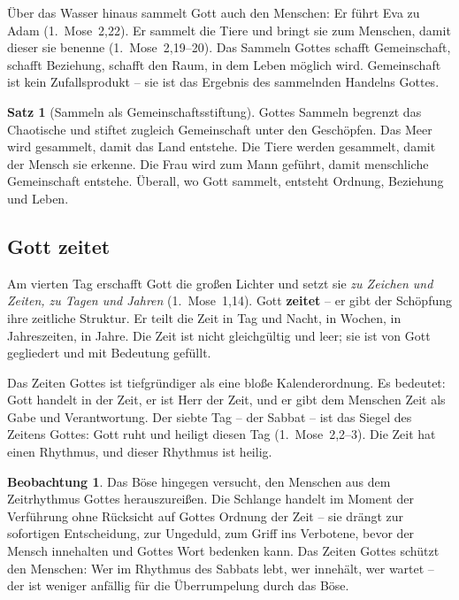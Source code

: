 ﻿\documentclass[a4paper,12pt]{article}
\theoremstyle{definition}
\newtheorem{theorem}{Satz}[section]
\newtheorem{observation}{Beobachtung}[section]
\begin{document}
Über das Wasser hinaus sammelt Gott auch den Menschen: Er führt Eva zu Adam
(1.~Mose~2,22). Er sammelt die Tiere und bringt sie zum Menschen, damit dieser
sie benenne (1.~Mose~2,19--20). Das Sammeln Gottes schafft Gemeinschaft, schafft
Beziehung, schafft den Raum, in dem Leben möglich wird. Gemeinschaft ist kein
Zufallsprodukt -- sie ist das Ergebnis des sammelnden Handelns Gottes.

\begin{theorem}[Sammeln als Gemeinschaftsstiftung]
	Gottes Sammeln begrenzt das Chaotische und stiftet zugleich Gemeinschaft unter
	den Geschöpfen. Das Meer wird gesammelt, damit das Land entstehe. Die Tiere
	werden gesammelt, damit der Mensch sie erkenne. Die Frau wird zum Mann geführt,
	damit menschliche Gemeinschaft entstehe. Überall, wo Gott sammelt, entsteht
	Ordnung, Beziehung und Leben.
\end{theorem}

\subsection{Gott zeitet}

Am vierten Tag erschafft Gott die großen Lichter und setzt sie \textit{zu
	Zeichen und Zeiten, zu Tagen und Jahren} (1.~Mose~1,14). Gott \textbf{zeitet} --
er gibt der Schöpfung ihre zeitliche Struktur. Er teilt die Zeit in Tag und Nacht,
in Wochen, in Jahreszeiten, in Jahre. Die Zeit ist nicht gleichgültig und leer;
sie ist von Gott gegliedert und mit Bedeutung gefüllt.

Das Zeiten Gottes ist tiefgründiger als eine bloße Kalenderordnung. Es bedeutet:
Gott handelt in der Zeit, er ist Herr der Zeit, und er gibt dem Menschen Zeit
als Gabe und Verantwortung. Der siebte Tag -- der Sabbat -- ist das Siegel des
Zeitens Gottes: Gott ruht und heiligt diesen Tag (1.~Mose~2,2--3). Die Zeit hat
einen Rhythmus, und dieser Rhythmus ist heilig.

\begin{observation}
	Das Böse hingegen versucht, den Menschen aus dem Zeitrhythmus Gottes
	herauszureißen. Die Schlange handelt im Moment der Verführung ohne Rücksicht
	auf Gottes Ordnung der Zeit -- sie drängt zur sofortigen Entscheidung, zur
	Ungeduld, zum Griff ins Verbotene, bevor der Mensch innehalten und Gottes Wort
	bedenken kann. Das Zeiten Gottes schützt den Menschen: Wer im Rhythmus des
	Sabbats lebt, wer inne\-hält, wer wartet -- der ist weniger anfällig für die
	Überrumpelung durch das Böse.
\end{observation}
\end{document}
